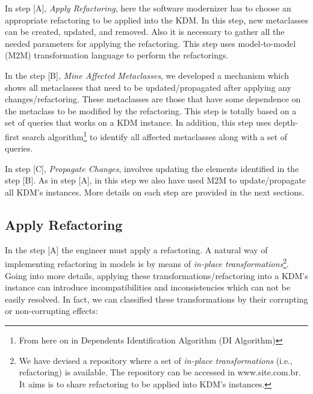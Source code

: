 In step [A], \textit{Apply Refactoring}, here the software modernizer has to choose an appropriate refactoring to be applied into the KDM. In this step, new metaclasses can be created, updated, and removed. Also it is necessary to gather all the needed parameters for applying the refactoring. %
This step uses model-to-model (M2M) transformation language to perform the refactorings.

In the step [B], \textit{Mine Affected Metaclasses}, we developed a mechanism which shows all metaclasses that need to be updated/propagated after applying any changes/refactoring. These metaclasses are those that have some dependence on the metaclass to be modified by the refactoring. This step is totally based on a set of queries that works on a KDM instance. In addition, this step uses depth-first search algorithm\footnote{From here on in Dependents Identification Algorithm (DI Algorithm)} to identify all affected metaclasses along with a set of queries. 

In step [C], \textit{Propagate Changes}, involves updating the elements identified in the step [B].  As in step [A], in this step we also have used M2M to update/propagate all KDM's instances. 
More details on each step are provided in the next sections.


\subsection{Apply Refactoring} %
\label{sub:apply_refactoring}

In the step [A] the engineer must apply a refactoring. A natural way of implementing refactoring in models is by means of \textit{in-place transformations}\footnote{We have devised a repository where a set of \textit{in-place transformations} (i.e., refactoring) is available. The repository can be accessed in www.site.com.br. It aims is to share refactoring to be applied into KDM's instances.}. %
Going into more details, applying these transformations/refactoring into a KDM's instance can introduce incompatibilities and inconsistencies which can not be easily resolved. In fact, we can classified these transformations by their corrupting or non-corrupting effects:%

